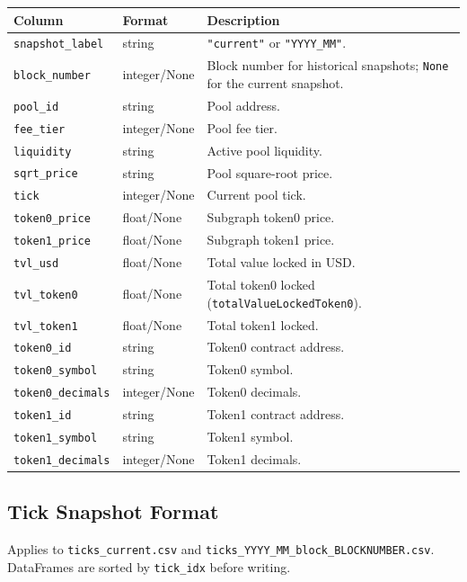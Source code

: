 \documentclass[11pt,a4paper]{article}
\begin{document}
\begin{xltabular}{\linewidth}{L{4.2cm}L{3.0cm}Y}
\toprule
\textbf{Column} & \textbf{Format} & \textbf{Description} \\
\midrule
\texttt{snapshot\_label} & string & \texttt{"current"} or
  \texttt{"YYYY\_MM"}. \\
\texttt{block\_number} & integer/None & Block number for historical
  snapshots; \texttt{None} for the current snapshot. \\
\texttt{pool\_id} & string & Pool address. \\
\texttt{fee\_tier} & integer/None & Pool fee tier. \\
\texttt{liquidity} & string & Active pool liquidity. \\
\texttt{sqrt\_price} & string & Pool square-root price. \\
\texttt{tick} & integer/None & Current pool tick. \\
\texttt{token0\_price} & float/None & Subgraph token0 price. \\
\texttt{token1\_price} & float/None & Subgraph token1 price. \\
\texttt{tvl\_usd} & float/None & Total value locked in USD. \\
\texttt{tvl\_token0} & float/None & Total token0 locked
  (\texttt{totalValueLockedToken0}). \\
\texttt{tvl\_token1} & float/None & Total token1 locked. \\
\texttt{token0\_id} & string & Token0 contract address. \\
\texttt{token0\_symbol} & string & Token0 symbol. \\
\texttt{token0\_decimals} & integer/None & Token0 decimals. \\
\texttt{token1\_id} & string & Token1 contract address. \\
\texttt{token1\_symbol} & string & Token1 symbol. \\
\texttt{token1\_decimals} & integer/None & Token1 decimals. \\
\bottomrule
\end{xltabular}

\subsection{Tick Snapshot Format}

Applies to \texttt{ticks\_current.csv} and
\texttt{ticks\_YYYY\_MM\_block\_BLOCKNUMBER.csv}.
DataFrames are sorted by \texttt{tick\_idx} before writing.
\end{document}

